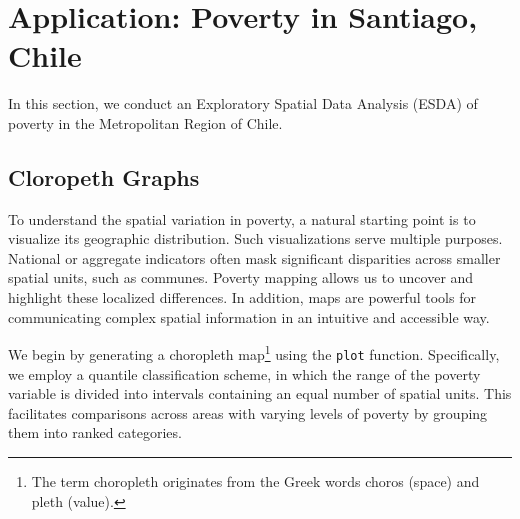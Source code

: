 \documentclass[english,12pt]{book}\usepackage[]{graphicx}\usepackage[]{xcolor}
\begin{document}



\section{Application: Poverty in Santiago, Chile}

In this section, we conduct an Exploratory Spatial Data Analysis (ESDA) of poverty in the Metropolitan Region of Chile.


\subsection{Cloropeth Graphs}

To understand the spatial variation in poverty, a natural starting point is to visualize its geographic distribution. Such visualizations serve multiple purposes. National or aggregate indicators often mask significant disparities across smaller spatial units, such as communes. Poverty mapping allows us to uncover and highlight these localized differences. In addition, maps are powerful tools for communicating complex spatial information in an intuitive and accessible way.

We begin by generating a choropleth map\footnote{The term choropleth originates from the Greek words choros (space) and pleth (value).} using the \verb|plot| function. Specifically, we employ a quantile classification scheme, in which the range of the poverty variable is divided into intervals containing an equal number of spatial units. This facilitates comparisons across areas with varying levels of poverty by grouping them into ranked categories.
\end{document}

